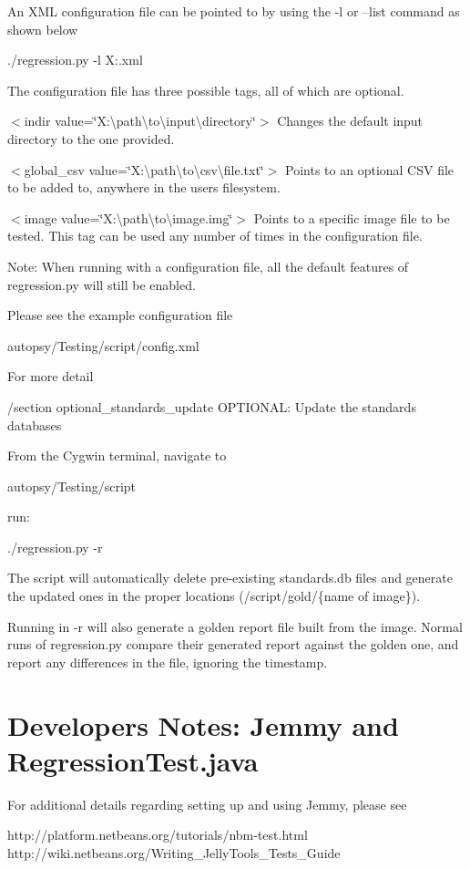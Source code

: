 An X\+ML configuration file can be pointed to by using the -\/l or --list command as shown below \begin{DoxyVerb}./regression.py -l X:\path\to\file.xml
\end{DoxyVerb}


The configuration file has three possible tags, all of which are optional.

$<$indir value=\char`\"{}\+X\+:\textbackslash{}path\textbackslash{}to\textbackslash{}input\textbackslash{}directory\char`\"{}$>$ Changes the default input directory to the one provided.

$<$global\+\_\+csv value=\char`\"{}\+X\+:\textbackslash{}path\textbackslash{}to\textbackslash{}csv\textbackslash{}file.\+txt\char`\"{}$>$ Points to an optional C\+SV file to be added to, anywhere in the user\textquotesingle{}s filesystem.

$<$image value=\char`\"{}\+X\+:\textbackslash{}path\textbackslash{}to\textbackslash{}image.\+img\char`\"{}$>$ Points to a specific image file to be tested. This tag can be used any number of times in the configuration file.

Note\+: When running with a configuration file, all the default features of regression.\+py will still be enabled.

Please see the example configuration file \begin{DoxyVerb}autopsy/Testing/script/config.xml
\end{DoxyVerb}


For more detail

/section optional\+\_\+standards\+\_\+update O\+P\+T\+I\+O\+N\+AL\+: Update the standards databases

From the Cygwin terminal, navigate to \begin{DoxyVerb}autopsy/Testing/script
\end{DoxyVerb}


run\+: \begin{DoxyVerb}./regression.py -r
\end{DoxyVerb}


The script will automatically delete pre-\/existing standards.\+db files and generate the updated ones in the proper locations (/script/gold/\{name of image\}).

Running in -\/r will also generate a golden report file built from the image. Normal runs of regression.\+py compare their generated report against the golden one, and report any differences in the file, ignoring the timestamp.\hypertarget{regression_test_page_developers_note_regression_test}{}\section{Developers Notes\+: Jemmy and Regression\+Test.\+java}\label{regression_test_page_developers_note_regression_test}
For additional details regarding setting up and using Jemmy, please see \begin{DoxyVerb}http://platform.netbeans.org/tutorials/nbm-test.html
http://wiki.netbeans.org/Writing_JellyTools_Tests_Guide
\end{DoxyVerb}


